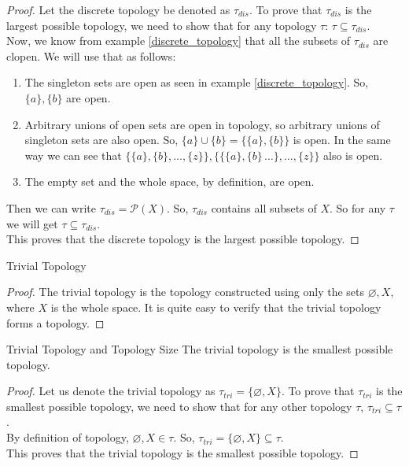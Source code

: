 \begin{proof}
    Let the discrete topology be denoted as $\tau_{dis}$. To prove that $\tau_{dis}$ is the largest possible topology, we need to show that for any topology $\tau$: $\tau\subseteq\tau_{dis}$.\\
    Now, we know from example \eqref{discrete_topology} that all the subsets of $\tau_{dis}$ are clopen. We will use that as follows:
    \begin{enumerate}
        \item The singleton sets are open as seen in example \eqref{discrete_topology}. So, $\{a\},\{b\}$ are open.
        \item Arbitrary unions of open sets are open in topology, so arbitrary unions of singleton sets are also open. So, $\{a\}\cup\{b\}=\big\{\{a\},\{b\}\big\}$ is open. In the same way we can see that $\big\{\{a\},\{b\},\dots,\{z\}\big\},\big\{\{\{a\},\{b\}\,\dots\},\dots,\{z\}\big\}$ also is open. 
        \item The empty set and the whole space, by definition, are open.
    \end{enumerate}
    Then we can write $\tau_{dis}=\mathcal{P}(X)$. So, $\tau_{dis}$ contains all subsets of $X$. So for any $\tau$ we will get $\tau\subseteq\tau_{dis}$.\\
    This proves that the discrete topology is the largest possible topology.
\end{proof}
\begin{Example}\label{trivial_topology}
    Trivial Topology
\end{Example}
\begin{proof}
    The trivial topology is the topology constructed using only the sets $\varnothing, X$, where $X$ is the whole space. It is quite easy to verify that the trivial topology forms a topology.
\end{proof}
\begin{Theorem}{Trivial Topology and Topology Size}\label{trivial_topology_size}
    The trivial topology is the smallest possible topology.
\end{Theorem}
\begin{proof}
    Let us denote the trivial topology as $\tau_{tri}=\{\varnothing, X\}$. To prove that $\tau_{tri}$ is the smallest possible topology, we need to show that for any other topology $\tau$, $\tau_{tri}\subseteq\tau$.\\
    By definition of topology, $\varnothing, X\in\tau$. So, $\tau_{tri}=\{\varnothing,X\}\subseteq\tau$.\\
    This proves that the trivial topology is the smallest possible topology.
\end{proof}
